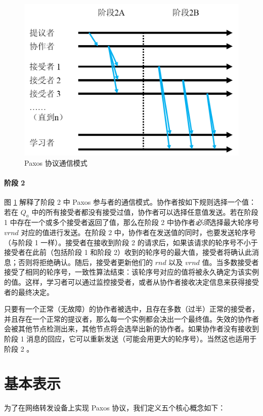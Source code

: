 \documentclass[conference]{IEEEtran}
\begin{document}
\begin{figure}
\centering
\includegraphics[scale=0.5]{img/image1.png}
\caption{Paxos 协议通信模式}
\label{l1}
\end{figure}

\paragraph{阶段 2}
图 \ref{l1} 解释了阶段 2 中 Paxos 参与者的通信模式。协作者按如下规则选择一个值：若在 $Q_a$ 中的所有接受者都没有接受过值，协作者可以选择任意值发送。若在阶段 1 中存在一个或多个接受者返回了值，那么在阶段 2 中协作者\emph{必须}选择最大轮序号 $vrnd$ 对应的值进行发送。在阶段 2 中，协作者在发送值的同时，也要发送轮序号（与阶段 1 一样）。接受者在接收到阶段 2 的请求后，如果该请求的轮序号不小于接受者在此前（包括阶段 1 和阶段 2）收到的轮序号的最大值，接受者将确认此消息；否则将拒绝确认。随后，接受者更新他们的 $rnd$ 以及 $vrnd$ 值。当多数接受者接受了相同的轮序号，一致性算法结束：该轮序号对应的值将被永久确定为该实例的值。这样，学习者可以通过监控接受者，或者从协作者接收决定信息来获得接受者的最终决定。

只要有一个正常（无故障）的协作者被选中，且存在多数（过半）正常的接受者，并且存在一个正常的提议者，那么每一个实例都会决出一个最终值。失效的协作者会被其他节点检测出来，其他节点将会选举出新的协作者。如果协作者没有接收到阶段 1 消息的回应，它可以重新发送（可能会用更大的轮序号）。当然这也适用于阶段 2 。

\section{基本表示}

为了在网络转发设备上实现 Paxos 协议，我们定义五个核心概念如下：
\end{document}
